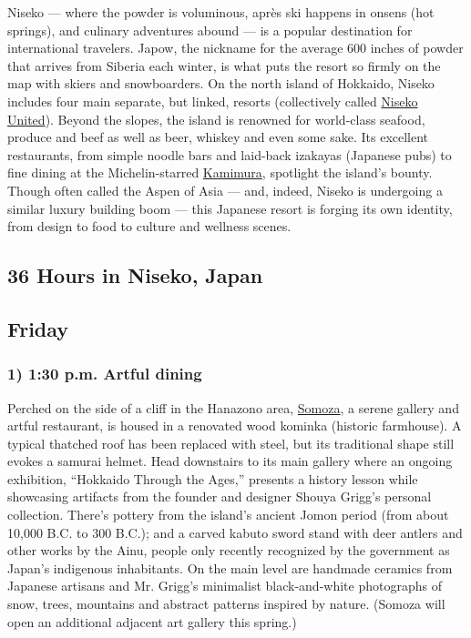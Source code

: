 Niseko --- where the powder is voluminous, après ski happens in onsens
(hot springs), and culinary adventures abound --- is a popular
destination for international travelers. Japow, the nickname for the
average 600 inches of powder that arrives from Siberia each winter, is
what puts the resort so firmly on the map with skiers and snowboarders.
On the north island of Hokkaido, Niseko includes four main separate, but
linked, resorts (collectively called \href{http://niseko.ne.jp}{Niseko
United}). Beyond the slopes, the island is renowned for world-class
seafood, produce and beef as well as beer, whiskey and even some sake.
Its excellent restaurants, from simple noodle bars and laid-back
izakayas (Japanese pubs) to fine dining at the Michelin-starred
\href{http://www.kamimura-niseko.com}{Kamimura}, spotlight the island's
bounty. Though often called the Aspen of Asia --- and, indeed, Niseko is
undergoing a similar luxury building boom --- this Japanese resort is
forging its own identity, from design to food to culture and wellness
scenes.

\hypertarget{36-hours-in-niseko-japan}{%
\subsection{36 Hours in Niseko, Japan}\label{36-hours-in-niseko-japan}}

\hypertarget{friday}{%
\subsection{Friday}\label{friday}}

\hypertarget{1-130-pm-artful-dining}{%
\subsubsection{1) 1:30 p.m. Artful
dining}\label{1-130-pm-artful-dining}}

Perched on the side of a cliff in the Hanazono area,
\href{http://Somoza.jp}{Somoza}, a serene gallery and artful restaurant,
is housed in a renovated wood kominka (historic farmhouse). A typical
thatched roof has been replaced with steel, but its traditional shape
still evokes a samurai helmet. Head downstairs to its main gallery where
an ongoing exhibition, ``Hokkaido Through the Ages,'' presents a history
lesson while showcasing artifacts from the founder and designer Shouya
Grigg's personal collection. There's pottery from the island's ancient
Jomon period (from about 10,000 B.C. to 300 B.C.); and a carved kabuto
sword stand with deer antlers and other works by the Ainu, people only
recently recognized by the government as Japan's indigenous inhabitants.
On the main level are handmade ceramics from Japanese artisans and Mr.
Grigg's minimalist black-and-white photographs of snow, trees, mountains
and abstract patterns inspired by nature. (Somoza will open an
additional adjacent art gallery this spring.)

